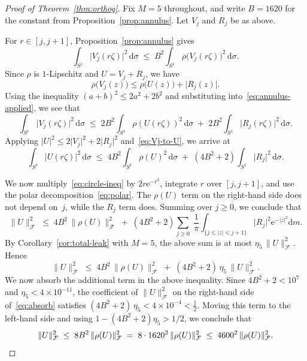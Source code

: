 \documentclass[11pt]{amsart}
\theoremstyle{remark}
\begin{document}
\begin{proof}[Proof of Theorem~\ref{thm:orthog}]
Fix $M = 5$ throughout, and write $B = 1620$ for the constant from
Proposition~\ref{prop:annulus}.  Let $V_j$ and $R_j$ be as above.
 \vspace{0.5em}

\noindent
For $r \in [j, j{+}1]$, Proposition~\ref{prop:annulus} gives
\begin{equation}\label{eq:annulus-applied}
\int_{S^1}\lvert V_j(r\zeta) \rvert^2\,\mathrm{d}\sigma
\;\le\;
B^2\int_{S^1}\rho\bigl(V_j(r\zeta)\bigr)^2\,\mathrm{d}\sigma.
\end{equation}
Since $\rho$ is $1$-Lipschitz and $U = V_j + R_j$, we have
\[
\rho\bigl(V_j(z)\bigr)
\le \rho\bigl(U(z)\bigr) + \lvert R_j(z) \rvert.
\]
Using the inequality $(a+b)^2 \le 2a^2 + 2b^2$ and substituting
into~\eqref{eq:annulus-applied}, we see that
\begin{equation}\label{eq:Vj-to-U}
\int_{S^1}\lvert V_j(r\zeta) \rvert^2\,\mathrm{d}\sigma
\;\le\;
2B^2\!\int_{S^1}\rho(U(r\zeta))^2\,\mathrm{d}\sigma
\;+\; 2B^2\!\int_{S^1}\lvert R_j(r\zeta) \rvert^2\,\mathrm{d}\sigma.
\end{equation}
Applying $\lvert U \rvert^2 \le 2\lvert V_j \rvert^2 + 2\lvert R_j \rvert^2$
and~\eqref{eq:Vj-to-U}, we arrive at
\begin{equation}\label{eq:circle-ineq}
\int_{S^1}\lvert U(r\zeta) \rvert^2\,\mathrm{d}\sigma
\;\le\;
4B^2\!\int_{S^1}\rho(U)^2\,\mathrm{d}\sigma
\;+\; (4B^2 + 2)\!\int_{S^1}\lvert R_j \rvert^2\,\mathrm{d}\sigma.
\end{equation}


\noindent
We now multiply~\eqref{eq:circle-ineq} by $2r\mathrm{e}^{-r^2}$, integrate $r$ over
$[j, j{+}1]$, and use the polar decomposition~\eqref{eq:polar}.  The
$\rho(U)$ term on the right-hand side does not depend on~$j$, while the $R_j$ term does.  Summing over $j \ge 0$, we conclude that
\[
\lVert U \rVert_{\mathcal{F}}^2
\;\le\;
4B^2\,\lVert \rho(U) \rVert_{\mathcal{F}}^2
\;+\;
(4B^2 + 2)\sum_{j \ge 0}\;
\frac{1}{\pi}\int_{\{j \le \lvert z \rvert < j+1\}}\!\!
\lvert R_j \rvert^2\mathrm{e}^{-\lvert z \rvert^2}\mathrm{d} m.
\]
By Corollary~\ref{cor:total-leak} with $M = 5$, the above sum is at
most $\eta_5\,\lVert U \rVert_{\mathcal{F}}^2$.  Hence
\begin{equation}\label{eq:absorb}
\lVert U \rVert_{\mathcal{F}}^2
\;\le\;
4B^2\,\lVert \rho(U) \rVert_{\mathcal{F}}^2
\;+\;
(4B^2 + 2)\,\eta_5\,\lVert U \rVert_{\mathcal{F}}^2.
\end{equation}
We now absorb the additional term in the above inequality.
Since $4B^2 + 2 < 10^7$ and $\eta_5 < 4 \times 10^{-11}$, the coefficient
of $\lVert U \rVert_{\mathcal{F}}^2$ on the right-hand side of~\eqref{eq:absorb} satisfies
$(4B^2 + 2)\,\eta_5 < 4 \times 10^{-4} < \tfrac{1}{2}$.
Moving this term to the left-hand side and using $1 - (4B^2+2)\eta_5 > 1/2$, we conclude that
\[
\lVert U \rVert_{\mathcal{F}}^2
\;\le\; 8B^2\,\lVert \rho(U) \rVert_{\mathcal{F}}^2
\;=\; 8 \cdot 1620^2\,\lVert \rho(U) \rVert_{\mathcal{F}}^2
\;\le\; 4600^2\,\lVert \rho(U) \rVert_{\mathcal{F}}^2.\qedhere
\]
\end{proof}
\end{document}
